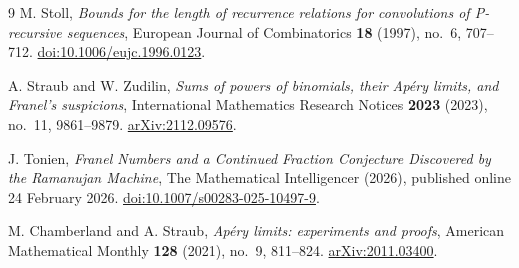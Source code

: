 \documentclass[11pt,a4paper]{article}
\theoremstyle{definition}\newtheorem{definition}[theorem]{Definition}
\theoremstyle{remark}\newtheorem{remark}[theorem]{Remark}
\begin{document}
\begin{thebibliography}{9}
M. Stoll, \emph{Bounds for the length of recurrence relations for convolutions
of P-recursive sequences}, European Journal of Combinatorics \textbf{18}
(1997), no.~6, 707--712.
\href{https://doi.org/10.1006/eujc.1996.0123}{doi:10.1006/eujc.1996.0123}.

A. Straub and W. Zudilin, \emph{Sums of powers of binomials, their Ap\'ery
limits, and Franel's suspicions}, International Mathematics Research Notices
\textbf{2023} (2023), no.~11, 9861--9879.
\href{https://arxiv.org/abs/2112.09576}{arXiv:2112.09576}.

J. Tonien, \emph{Franel Numbers and a Continued Fraction Conjecture Discovered
by the Ramanujan Machine}, The Mathematical Intelligencer (2026), published
online 24 February 2026.
\href{https://doi.org/10.1007/s00283-025-10497-9}{doi:10.1007/s00283-025-10497-9}.

M. Chamberland and A. Straub, \emph{Ap\'ery limits: experiments and proofs},
American Mathematical Monthly \textbf{128} (2021), no.~9, 811--824.
\href{https://arxiv.org/abs/2011.03400}{arXiv:2011.03400}.
\end{thebibliography}
\end{document}
